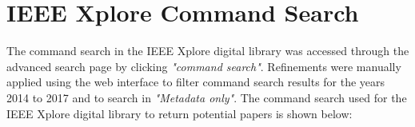 


\section{IEEE Xplore Command Search}
\label{appendix:ieeexplore_commandsearch}
The command search in the IEEE Xplore digital library was accessed through the advanced search page by clicking \textit{"command search"}. Refinements were manually applied using the web interface to filter command search results for the years 2014 to 2017 and to search in \textit{"Metadata only"}. The command search used for the IEEE Xplore digital library to return potential papers is shown below:



